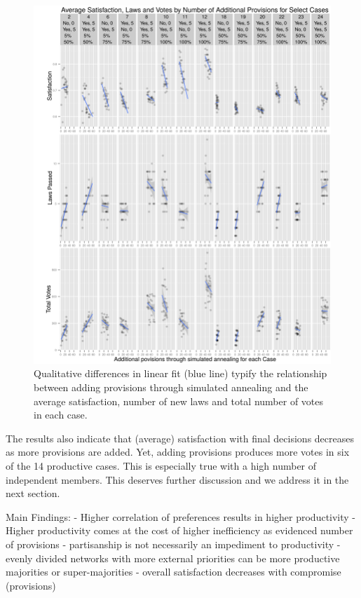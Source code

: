 \documentclass[pdftex,12pt]{llncs}
\begin{document}
\begin{figure}[h!]
\centering
\includegraphics[width=4.75in]{combinedCases_crop.pdf}
\caption[ ]{Qualitative differences in linear fit (blue line) typify the relationship between adding provisions through simulated annealing and the average satisfaction, number of new laws and total number of votes in each case.} 
\label{combined}
\end{figure}
  
The results also indicate that (average) satisfaction with final decisions decreases as more provisions are added.
Yet, adding provisions produces more votes in six of the 14 productive cases. 
This is especially true with a high number of independent members.  
This deserves further discussion and we address it in the next section.

Main Findings:
	- Higher correlation of preferences results in higher productivity
	- Higher productivity comes at the cost of higher inefficiency as evidenced number of provisions
	- partisanship is not necessarily an impediment to productivity
	- evenly divided networks with more external priorities can be more productive majorities or super-majorities
	- overall satisfaction decreases with compromise (provisions)
\end{document}
